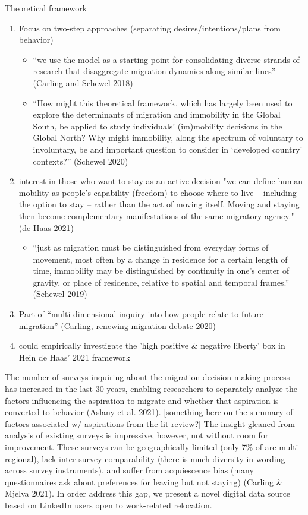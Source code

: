 Theoretical framework
\begin{enumerate}
    \item Focus on two-step approaches (separating desires/intentions/plans from behavior)
    \begin{itemize}
        \item “we use the model as a starting point for consolidating diverse strands of research that disaggregate migration dynamics along similar lines” (Carling and Schewel 2018)
        \item “How might this theoretical framework, which has largely been used to explore the determinants of migration and immobility in the Global South, be applied to study individuals’ (im)mobility decisions in the Global North? Why might immobility, along the spectrum of voluntary to involuntary, be and important question to consider in ‘developed country’ contexts?” (Schewel 2020)
    \end{itemize}
    \item interest in those who want to stay as an active decision "we can define human mobility as people’s capability (freedom) to choose where to live – including the option to stay – rather than the act of moving itself. Moving and staying then become complementary manifestations of the same migratory agency." (de Haas 2021)
    \begin{itemize}
        \item “just as migration must be distinguished from everyday forms of movement, most often by a change in residence for a certain length of time, immobility may be distinguished by continuity in one’s center of gravity, or place of residence, relative to spatial and temporal frames.” (Schewel 2019)
    \end{itemize}
    \item Part of “multi-dimensional inquiry into how people relate to future migration” (Carling, renewing migration debate 2020)
    \item could empirically investigate the 'high positive \& negative liberty' box in Hein de Haas' 2021 framework
\end{enumerate}
The number of surveys inquiring about the migration decision-making process has increased in the last 30 years, enabling researchers to separately analyze the factors influencing the aspiration to migrate and whether that aspiration is converted to behavior (Aslany et al. 2021). [something here on the summary of factors associated w/ aspirations from the lit review?] The insight gleaned from analysis of existing surveys is impressive, however, not without room for improvement. These surveys can be geographically limited (only 7\% of are multi-regional), lack inter-survey comparability (there is much diversity in wording across survey instruments), and suffer from acquiescence bias (many questionnaires ask about preferences for leaving but not staying) (Carling \& Mjelva 2021). In order address this gap, we present a novel digital data source based on LinkedIn users open to work-related relocation.

